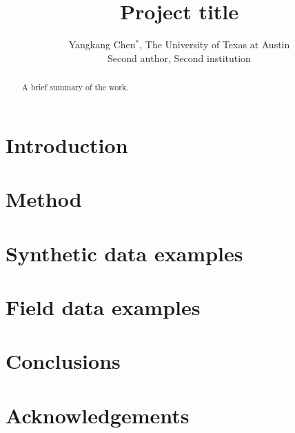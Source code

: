 \title{Project title}
\author{Yangkang Chen$^*$, The University of Texas at Austin\\
        Second author, Second institution}
\maketitle



\begin{abstract}
A brief summary of the work.
\end{abstract}

\newpage

\section{Introduction}

\section{Method}

\section{Synthetic data examples}

\section{Field data examples}

 
\section{Conclusions}


\section{Acknowledgements}


































